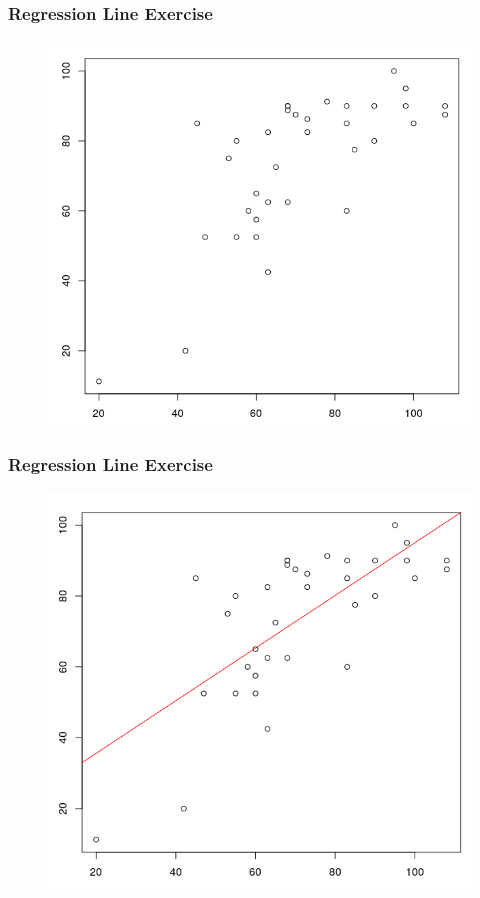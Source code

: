 \documentclass[xcolor=dvipsnames]{beamer}
\begin{document}
\begin{frame}
  \frametitle{Regression Line Exercise}
  \begin{figure}[h]
    \includegraphics[scale=0.4]{./diagrams/grades1.png}
  \end{figure}
\end{frame}

\begin{frame}
  \frametitle{Regression Line Exercise}
  \begin{figure}[h]
    \includegraphics[scale=0.4]{./diagrams/grades2.png}
  \end{figure}
\end{frame}
\end{document}
